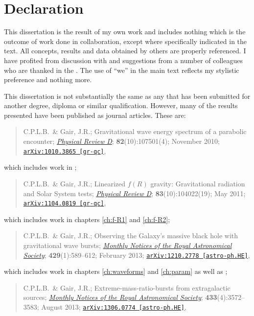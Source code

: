 \chapter*{Declaration}

This dissertation is the result of my own work and includes nothing which is the outcome of work done in collaboration, except where specifically indicated in the text. All concepts, results and data obtained by others are properly referenced. I have profited from discussion with and suggestions from a number of colleagues who are thanked in the . The use of ``we'' in the main text reflects my stylistic preference and nothing more.

This dissertation is not substantially the same as any that has been submitted for another degree, diploma or similar qualification. However, many of the results presented have been published as journal articles. These are:
\begin{quote}
C.P.L.B.\ \& Gair, J.R.; Gravitational wave energy spectrum of a parabolic encounter; \href{http://dx.doi.org/10.1103/PhysRevD.82.107501}{\it Physical Review D}; {\bf 82}(10):107501(4); November 2010; \linebreak \href{http://arxiv.org/abs/1010.3865}{\tt arXiv:1010.3865 [gr-qc]},
\end{quote}
which includes work in ;
\begin{quote}
C.P.L.B.\ \& Gair, J.R.; Linearized $f(R)$ gravity: Gravitational radiation and Solar System tests; \href{http://dx.doi.org/10.1103/PhysRevD.83.104022}{\it Physical Review D}; {\bf 83}(10):104022(19); May 2011; \href{http://arxiv.org/abs/1104.0819}{\tt arXiv:1104.0819 [gr-qc]},
\end{quote}
which includes work in chapters \ref{ch:f-R1} and \ref{ch:f-R2};
\begin{quote}
C.P.L.B.\ \& Gair, J.R.; Observing the Galaxy's massive black hole with gravitational wave bursts; \href{http://dx.doi.org/10.1093/mnras/sts360}{\it Monthly Notices of the Royal Astronomical Society}; {\bf 429}(1):589--612; February 2013; \href{http://arxiv.org/abs/1210.2778}{\tt arXiv:1210.2778 [astro-ph.HE]},
\end{quote}
which includes work in chapters \ref{ch:waveforms} and \ref{ch:param} as well as ;
\begin{quote}
C.P.L.B.\ \& Gair, J.R.; Extreme-mass-ratio-bursts from extragalactic sources; \href{http://dx.doi.org/10.1093/mnras/stt990}{\it Monthly Notices of the Royal Astronomical Society}; {\bf 433}(4):3572--3583; August 2013; \href{http://arxiv.org/abs/1306.0774}{\tt arXiv:1306.0774 [astro-ph.HE]},
\end{quote}
